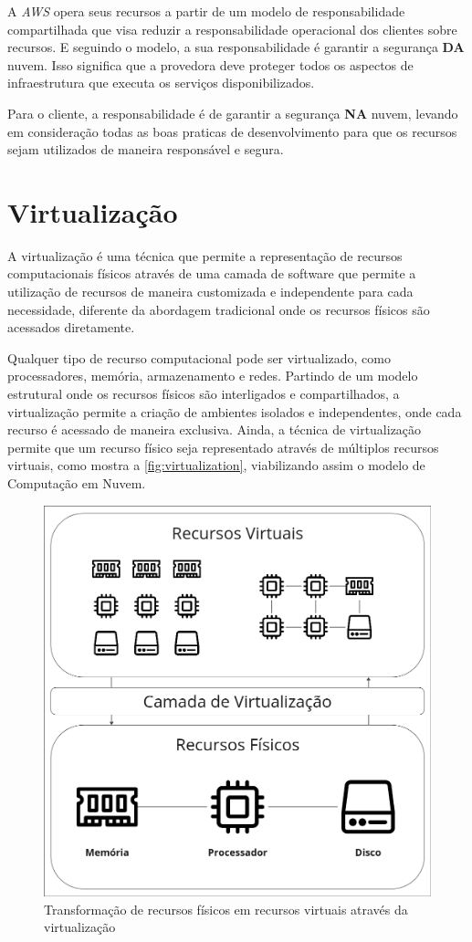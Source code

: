 A \textit{AWS} opera seus recursos a partir de um modelo de responsabilidade compartilhada que visa reduzir a responsabilidade operacional dos clientes sobre recursos. \citep{awssharedresponsibilitymodel} E seguindo o modelo, a sua responsabilidade é garantir a segurança \textbf{DA} nuvem. Isso significa que a provedora deve proteger todos os aspectos de infraestrutura que executa os serviços disponibilizados.

Para o cliente, a responsabilidade é de garantir a segurança \textbf{NA} nuvem, levando em consideração todas as boas praticas de desenvolvimento para que os recursos sejam utilizados de maneira responsável e segura.

\section{Virtualização}
\label{sec:virtualization}

A virtualização é uma técnica que permite a representação de recursos computacionais físicos através de uma camada de software que permite a utilização de recursos de maneira customizada e independente para cada necessidade, diferente da abordagem tradicional onde os recursos físicos são acessados diretamente. \citep{cloudcomputingcambridge}

Qualquer tipo de recurso computacional pode ser virtualizado, como processadores, memória, armazenamento e redes. Partindo de um modelo estrutural onde os recursos físicos são interligados e compartilhados, a virtualização permite a criação de ambientes isolados e independentes, onde cada recurso é acessado de maneira exclusiva. Ainda, a técnica de virtualização permite que um recurso físico seja representado através de múltiplos recursos virtuais, como mostra a \autoref{fig:virtualization}, viabilizando assim o modelo de Computação em Nuvem. \citep{cloudcomputingcambridge}

\begin{figure}[H]
\captionsetup{width=.7\textwidth}%
\caption{Transformação de recursos físicos em recursos virtuais através da virtualização}
\label{fig:virtualization}
\includegraphics[width=.7\textwidth]{capitulos/1-revisao-da-literatura/files/virtualization-layers.png}
\end{figure}

